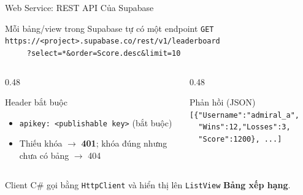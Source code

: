 \begin{frame}{Web Service: REST API Của Supabase}
  \begin{block}{Mỗi bảng/view trong Supabase tự có một endpoint}
    \texttt{GET https://<project>.supabase.co/rest/v1/leaderboard}\\
    \texttt{\ \ \ \ \ ?select=*\&order=Score.desc\&limit=10}
  \end{block}
  \begin{columns}[T]
    \begin{column}{0.48\textwidth}
      \begin{block}{Header bắt buộc}
        \begin{itemize}
          \item \texttt{apikey: <publishable key>} (bắt buộc)
          \item Thiếu khóa $\rightarrow$ \textbf{401}; khóa đúng nhưng chưa có bảng $\rightarrow$ 404
        \end{itemize}
      \end{block}
    \end{column}
    \begin{column}{0.48\textwidth}
      \begin{exampleblock}{Phản hồi (JSON)}
        \footnotesize
        \texttt{[\{"Username":"admiral\_a",}\\
        \texttt{\ \ "Wins":12,"Losses":3,}\\
        \texttt{\ \ "Score":1200\}, ...]}
      \end{exampleblock}
    \end{column}
  \end{columns}
  \vspace{0.1cm}
  \footnotesize Client C\# gọi bằng \texttt{HttpClient} và hiển thị lên \texttt{ListView} \textbf{Bảng xếp hạng}.
\end{frame}

